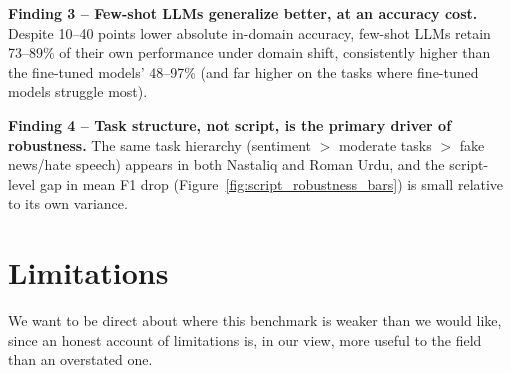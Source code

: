 \documentclass[10pt,twocolumn,journal]{IEEEtran}
\begin{document}
\textbf{Finding 3 -- Few-shot LLMs generalize better, at an accuracy cost.} Despite 10--40 points lower absolute in-domain accuracy, few-shot LLMs retain 73--89\% of their own performance under domain shift, consistently higher than the fine-tuned models' 48--97\% (and far higher on the tasks where fine-tuned models struggle most).

\textbf{Finding 4 -- Task structure, not script, is the primary driver of robustness.} The same task hierarchy (sentiment $>$ moderate tasks $>$ fake news/hate speech) appears in both Nastaliq and Roman Urdu, and the script-level gap in mean F1 drop (Figure~\ref{fig:script_robustness_bars}) is small relative to its own variance.

\section{Limitations}
\label{sec:limitations}

We want to be direct about where this benchmark is weaker than we would like, since an honest account of limitations is, in our view, more useful to the field than an overstated one.
\end{document}
